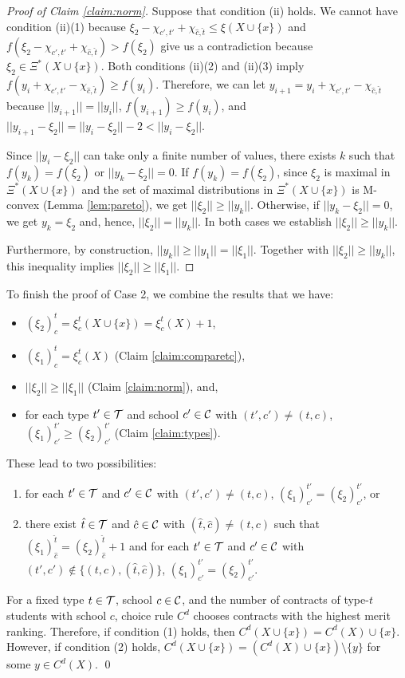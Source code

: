 \documentclass[12pt]{amsart}
\theoremstyle{remark}
\newcommand{\norm}[1]{|| #1 ||}
\begin{document}
\begin{proof}[Proof of Claim \ref{claim:norm}]
Suppose that condition (ii) holds. We cannot have condition (ii)(1)
because $\xi_2-\chi_{c',t'}+\chi_{\hat c, \hat t} \leq \xi(X\cup\{x\})$ and
$f(\xi_2-\chi_{c',t'}+\chi_{\hat c, \hat t})>f(\xi_2)$ give us a contradiction
because $\xi_2\in \Xi^*(X\cup \{x\})$.
Both conditions (ii)(2) and (ii)(3) imply $f(y_i+\chi_{c',t'}-\chi_{\hat c, \hat t}) \geq f(y_i)$.
Therefore, we can let $y_{i+1}=y_i+\chi_{c',t'}-\chi_{\hat c, \hat t}$
because $\norm{y_{i+1}}=\norm{y_i}$, $f(y_{i+1}) \geq f(y_{i})$, and
$\norm{y_{i+1}-\xi_2}=\norm{y_i-\xi_2}-2< \norm{y_i-\xi_2}$.

Since $\norm{y_i-\xi_2}$ can take only a finite number of values,
there exists $k$ such that $f(y_k)=f(\xi_2)$ or $\norm{y_k-\xi_2}=0$.
If $f(y_k)=f(\xi_2)$, since $\xi_2$ is maximal in $\Xi^*(X\cup \{x\})$
and the set of maximal distributions in $\Xi^*(X\cup \{x\})$ is
M-convex (Lemma \ref{lem:pareto}), we get $\norm{\xi_2} \geq \norm{y_k}$. Otherwise, if
$\norm{y_k-\xi_2}=0$, we get $y_k=\xi_2$ and, hence, $\norm{\xi_2} = \norm{y_k}$. In both cases we
establish $\norm{\xi_2} \geq \norm{y_k}$.

Furthermore, by construction, $\norm{y_k}\geq \norm{y_1}=\norm{\xi_1}$. Together with $\norm{\xi_2} \geq \norm{y_k}$,
this inequality implies $\norm{\xi_2}\geq \norm{\xi_1}$.
\end{proof}

To finish the proof of Case 2, we combine the results that we have:
\begin{itemize}
\item $(\xi_2)_c^t=\xi^t_c(X\cup \{x\})=\xi^t_c(X)+1$,
\item $(\xi_1)_c^t=\xi^t_c(X)$ (Claim \ref{claim:comparetc}),
\item $\norm{\xi_2} \geq \norm{\xi_1}$ (Claim \ref{claim:norm}), and,
\item for each type $t'\in \mathcal{T}$ and school $c'\in \mathcal{C}$
with $(t',c')\neq (t,c)$, $(\xi_1)_{c'}^{t'} \geq (\xi_2)_{c'}^{t'}$ (Claim \ref{claim:types}).
\end{itemize}
These lead to two possibilities:
\begin{enumerate}
  \item for each $t'\in \mathcal{T}$ and $c' \in \mathcal{C}$ with $(t',c')\neq (t,c)$, $(\xi_1)_{c'}^{t'} = (\xi_2)_{c'}^{t'}$, or
  \item there exist $\hat t \in \mathcal{T}$ and $\hat c \in \mathcal{C}$ with $(\hat t, \hat c) \neq (t,c)$ such that
  $(\xi_1)_{\hat c}^{\hat t} = (\xi_2)_{\hat c}^{\hat t}+1$ and for each $t'\in \mathcal{T}$ and $c'\in \mathcal{C}$ with $(t',c')\notin
  \{(t,c),(\hat t, \hat c)\}$, $(\xi_1)_{c'}^{t'} = (\xi_2)_{c'}^{t'}$.
\end{enumerate}
For a fixed type $t\in \mathcal{T}$, school $c\in \mathcal{C}$, and the number of contracts of type-$t$ students with school $c$, choice rule $C^d$ chooses contracts with the highest merit ranking. Therefore, if condition (1) holds, then $C^d(X\cup \{x\})=C^d(X) \cup \{x\}$. However, if
condition (2) holds, $C^d(X\cup \{x\})=(C^d(X) \cup \{x\})\setminus \{y\}$ for some $y\in C^d(X)$.
\qed
\bigskip
\end{document}

